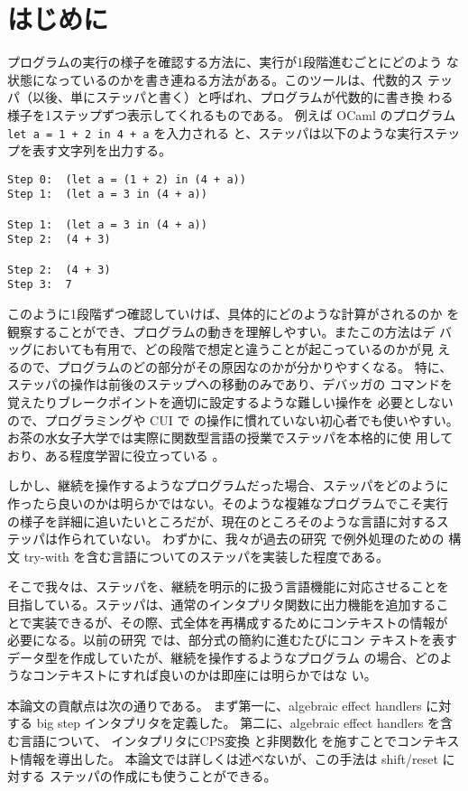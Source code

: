 \section{はじめに}

プログラムの実行の様子を確認する方法に、実行が1段階進むごとにどのよう
な状態になっているのかを書き連ねる方法がある。このツールは、代数的ス
テッパ（以後、単にステッパと書く）と呼ばれ、プログラムが代数的に書き換
わる様子を1ステップずつ表示してくれるものである。
例えば OCaml のプログラム \texttt{let a = 1 + 2 in 4 + a} を入力される
と、ステッパは以下のような実行ステップを表す文字列を出力する。

\begin{verbatim}
Step 0:  (let a = (1 + 2) in (4 + a))
Step 1:  (let a = 3 in (4 + a))

Step 1:  (let a = 3 in (4 + a))
Step 2:  (4 + 3)

Step 2:  (4 + 3)
Step 3:  7
\end{verbatim}

このように1段階ずつ確認していけば、具体的にどのような計算がされるのか
を観察することができ、プログラムの動きを理解しやすい。またこの方法はデ
バッグにおいても有用で、どの段階で想定と違うことが起こっているのかが見
えるので、プログラムのどの部分がその原因なのかが分かりやすくなる。
特に、ステッパの操作は前後のステップへの移動のみであり、デバッガの
コマンドを覚えたりブレークポイントを適切に設定するような難しい操作を
必要としないので、プログラミングや CUI で の操作に慣れていない初心者でも使いやすい。
お茶の水女子大学では実際に関数型言語の授業でステッパを本格的に使
用しており、ある程度学習に役立っている \cite{FCA19}。

しかし、継続を操作するようなプログラムだった場合、ステッパをどのように
作ったら良いのかは明らかではない。そのような複雑なプログラムでこそ実行
の様子を詳細に追いたいところだが、現在のところそのような言語に対するス
テッパは作られていない。
わずかに、我々が過去の研究 \cite{FCA19} で例外処理のための
構文 try-with を含む言語についてのステッパを実装した程度である。

そこで我々は、ステッパを、継続を明示的に扱う言語機能に対応させることを
目指している。ステッパは、通常のインタプリタ関数に出力機能を追加するこ
とで実装できるが、その際、式全体を再構成するためにコンテキストの情報が
必要になる。以前の研究 \cite{FCA19} では、部分式の簡約に進むたびにコン
テキストを表すデータ型を作成していたが、継続を操作するようなプログラム
の場合、どのようなコンテキストにすれば良いのかは即座には明らかではな
い。

本論文の貢献点は次の通りである。
まず第一に、algebraic effect handlers に対する big step インタプリタを定義した。
第二に、algebraic effect handlers を含む言語について、
インタプリタにCPS変換 \cite{PLOTKIN1975125}と非関数化
\cite{Reynolds1998}を施すことでコンテキスト情報を導出した。
本論文では詳しくは述べないが、この手法は shift/reset に対する
ステッパの作成にも使うことができる。

